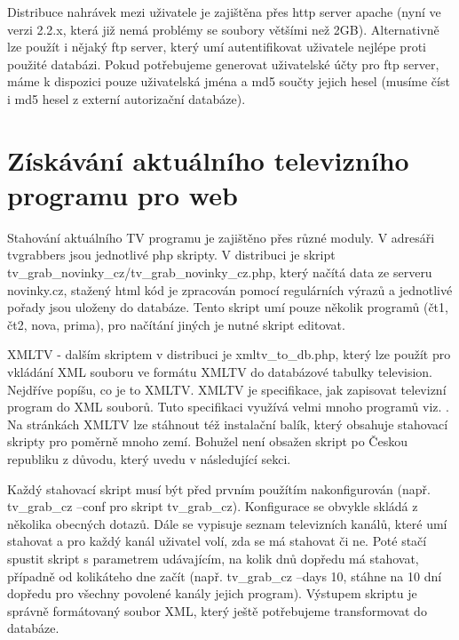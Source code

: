 \vspace{10pt}

Distribuce nahrávek mezi uživatele je zajištěna přes http server apache (nyní ve verzi 2.2.x, která již nemá problémy se soubory většími než 2GB). Alternativně lze použít i nějaký ftp server, který umí autentifikovat uživatele nejlépe proti použité databázi. Pokud potřebujeme generovat uživatelské účty pro ftp server, máme k dispozici pouze uživatelská jména a md5 součty jejich hesel (musíme číst i md5 hesel z externí autorizační databáze).

\vspace{10pt}

\section{Získávání aktuálního televizního programu pro web}

\vspace{10pt}

Stahování aktuálního TV programu je zajištěno přes různé moduly. V adresáři tvgrabbers jsou jednotlivé php skripty. V distribuci je skript tv\_grab\_novinky\_cz/tv\_grab\_novinky\_cz.php, který načítá data ze serveru novinky.cz, stažený html kód je zpracován pomocí regulárních výrazů a jednotlivé pořady jsou uloženy do databáze. Tento skript umí pouze několik programů (čt1, čt2, nova, prima), pro načítání jiných je nutné skript editovat.

\vspace{10pt}

XMLTV - dalším skriptem v distribuci je xmltv\_to\_db.php, který lze použít pro vkládání XML souboru ve formátu XMLTV do databázové tabulky television. Nejdříve popíšu, co je to XMLTV. XMLTV je specifikace, jak zapisovat televizní program do XML souborů. Tuto specifikaci využívá velmi mnoho programů viz. \cite{xmltvURL}. Na stránkách XMLTV lze stáhnout též instalační balík, který obsahuje stahovací skripty pro poměrně mnoho zemí. Bohužel není obsažen skript po Českou republiku z důvodu, který uvedu v následující sekci.

\vspace{10pt}

Každý stahovací skript musí být před prvním použítím nakonfigurován (např. tv\_grab\_cz --conf pro skript tv\_grab\_cz). Konfigurace se obvykle skládá z několika obecných dotazů. Dále se vypisuje seznam televizních kanálů, které umí stahovat a pro každý kanál uživatel volí, zda se má stahovat či ne. Poté stačí spustit skript s parametrem udávajícím, na kolik dnů dopředu má stahovat, případně od kolikáteho dne začít (např. tv\_grab\_cz --days 10, stáhne na 10 dní dopředu pro všechny povolené kanály jejich program). Výstupem skriptu je správně formátovaný soubor XML, který ještě potřebujeme transformovat do databáze.

